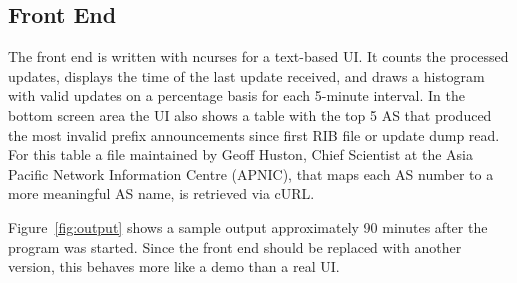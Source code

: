 \subsection{Front End}
The front end is written with ncurses for a text-based UI. It counts the
processed updates, displays the time of the last update received, and
draws a histogram with valid updates on a percentage basis for each
5-minute interval. In the bottom screen area the UI also shows a table
with the top 5 AS that produced the most invalid prefix announcements
since first RIB file or update dump read. For this table a file
maintained by Geoff Huston, Chief Scientist at the Asia Pacific Network
Information Centre (APNIC), that maps each AS number to a more
meaningful AS name, is retrieved via cURL.

Figure~\ref{fig:output} shows a sample output approximately 90 minutes
after the program was started. Since the front end should be replaced
with another version, this behaves more like a demo than a real UI.

